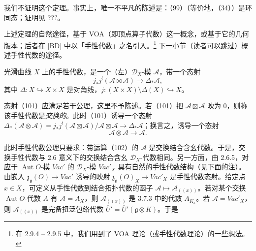 
我们不证明这个定理。事实上，唯一不平凡的陈述是：（99）（等价地，（34））是环同态；证明见 ???。

上述定理的自然途径，基于 VOA（即顶点算子代数）这一概念，或基于它的几何版本；后者在 [BD] 中以「手性代数」之名引入。\footnote{在 2.9.4 -- 2.9.5 中，我们用到了 VOA 理论（或手性代数理论）的一些想法。} 下一小节（读者可以跳过）概述手性代数的途径。

 光滑曲线 $X$ 上的手性代数，是一个（左）$\mathcal{D}_X$-模 $\mathcal{A}$，带一个态射
\begin{equation}\tag{101}
j_*j^{!}(\mathcal{A}\boxtimes\mathcal{A})\to\Delta_*\mathcal{A},
\end{equation}
其中 $\Delta:X\hookrightarrow X\times X$ 是对角线，$j:(X\times X)\setminus\Delta(X)\hookrightarrow X$。

态射（101）应满足若干公理，这里不予陈述。若（101）把 $\mathcal{A}\boxtimes\mathcal{A}$ 映为 0，则称该手性代数是\emph{交换的}。此时（101）诱导一个态射 $\Delta_*(\mathcal{A}\otimes\mathcal{A})=j_*j^{!}(\mathcal{A}\boxtimes\mathcal{A})/\mathcal{A}\boxtimes\mathcal{A}\to\Delta_*\mathcal{A}$；换言之，诱导一个态射
\begin{equation}\tag{102}
\mathcal{A}\otimes\mathcal{A}\to\mathcal{A}.
\end{equation}

此时手性代数公理只要求：带运算（102）的 $\mathcal{A}$ 是交换结合含幺代数。于是，交换手性代数与 2.6 意义下的交换结合含幺 $\mathcal{D}_X$-代数相同。另一方面，由 2.6.5，对应于 $\operatorname{Aut}O$-模 $\mathit{Vac}'$ 的 $\mathcal{D}_X$-模 $\mathit{Vac}'_X$ 具有自然的手性代数结构（见下面的注）。由嵌入 $\mathfrak{z}_{\mathfrak{g}}(O)\to\mathit{Vac}'$ 诱导的映射 $\mathfrak{z}_{\mathfrak{g}}(O)_X\to\mathit{Vac}'_X$ 是手性代数态射。给定点 $x\in X$，可定义从手性代数到结合拓扑代数的函子 $\mathcal{A}\mapsto\mathcal{A}_{((x))}$。若对某个交换 $\operatorname{Aut}O$-代数 $A$ 有 $\mathcal{A}=A_X$，则 $\mathcal{A}_{((x))}$ 是 3.7.3 中的代数 $A_{K_x}$。若 $\mathcal{A}=\mathit{Vac}'_X$，则 $\mathcal{A}_{((x))}$ 是完备扭泛包络代数 $\overline{U}'=\overline{U}'(\mathfrak{g}\otimes K)$。于是


